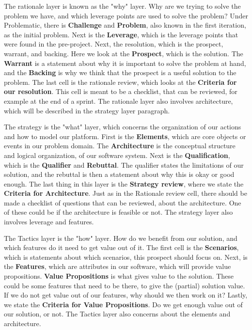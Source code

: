 The rationale layer is known as the "why" layer.
Why are we trying to solve the problem we have, and which leverage points are used to solve the problem?
Under Problematic, there is \textbf{Challenge} and \textbf{Problem}, also known in the first iteration, as the initial problem.
Next is the \textbf{Leverage}, which is the leverage points that were found in the pre-project.
Next, the resolution, which is the prospect, warrant, and backing. 
Here we look at the \textbf{Prospect}, which is the solution.
The \textbf{Warrant} is a statement about why it is important to solve the problem at hand, and the \textbf{Backing} is why we think that the prospect is a useful solution to the problem.
The last cell is the rationale review, which looks at the \textbf{Criteria for our resolution}.
This cell is meant to be a checklist, that can be reviewed, for example at the end of a sprint.
The rationale layer also involves architecture, which will be described in the strategy layer paragraph.

The strategy is the "what" layer, which concerns the organization of our actions and how to model our platform.
First is the \textbf{Elements}, which are core objects or events in our problem domain.
The \textbf{Architecture} is the conceptual structure and logical organization, of our software system.
Next is the \textbf{Qualification}, which is the \textbf{Qualifier} and \textbf{Rebuttal}.
The qualifier states the limitations of our solution, and the rebuttal is then a statement about why this is okay or good enough.
The last thing in this layer is the \textbf{Strategy review}, where we state the \textbf{Criteria for Architecture}.
Just as in the Rationale review cell, there should be made a checklist of questions that can be reviewed, about the architecture.
One of these could be if the architecture is feasible or not.
The strategy layer also involves leverage and features.

The Tactics layer is the "how" layer.
How do we benefit from our solution, and which features do it need to get value out of it.
The first cell is the \textbf{Scenarios}, which is statements about which scenarios, this prospect should focus on.
Next, is the \textbf{Features}, which are attributes in our software, which will provide value propositions.
\textbf{Value Propositions} is what gives value to the solution.
These could be some features that need to be there, to give the (partial) solution value. 
If we do not get value out of our features, why should we then work on it?
Lastly, we state the \textbf{Criteria for Value Propositions}.
Do we get enough value out of our solution, or not.
The Tactics layer also concerns about the elements and architecture.

